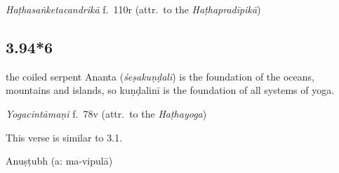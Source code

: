 \begin{ekdosis}
\begin{testimonia}[hp03_094_5]
\emph{Haṭhasaṅketacandrikā} f.~110r (attr.~to the \emph{Haṭhapradīpikā})
\begin{versinnote}
\end{versinnote}
\end{testimonia}



\subsection*{3.94*6}
\begin{translation}[hp03_094_6]
[Just as] the coiled serpent Ananta (\emph{śeṣa\-kuṇḍalī}) is the foundation of the oceans, mountains and islands, so kuṇḍalinī is the foundation of all systems of yoga.
\end{translation}


\begin{testimonia}[hp03_094_6]

\emph{Yogacintāmaṇi} f.~78v (attr.~to the \emph{Haṭhayoga})
\begin{versinnote}
\end{versinnote}
\end{testimonia}

\begin{philcomm}[hp03_094_6]
This verse is similar to 3.1.
\end{philcomm}

\begin{metre}[hp03_094_6]
Anuṣṭubh (a: ma-vipulā)
\end{metre}


\end{ekdosis}
